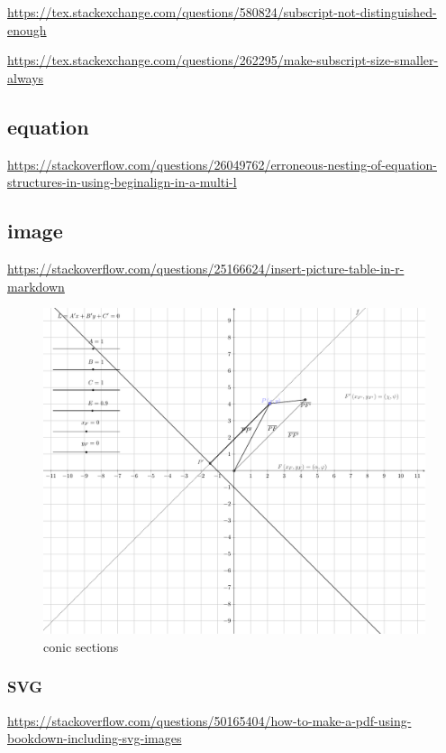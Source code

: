 \documentclass[
]{book}
\theoremstyle{definition}
\theoremstyle{definition}
\theoremstyle{definition}
\theoremstyle{definition}
\theoremstyle{remark}
\begin{document}
\url{https://tex.stackexchange.com/questions/580824/subscript-not-distinguished-enough}

\url{https://tex.stackexchange.com/questions/262295/make-subscript-size-smaller-always}

\hypertarget{equation}{%
\subsection{equation}\label{equation}}

\url{https://stackoverflow.com/questions/26049762/erroneous-nesting-of-equation-structures-in-using-beginalign-in-a-multi-l}

\hypertarget{image}{%
\subsection{image}\label{image}}

\url{https://stackoverflow.com/questions/25166624/insert-picture-table-in-r-markdown}

\begin{figure}
\includegraphics[width=0.75\linewidth]{202401280001-test_files/figure-latex/unnamed-chunk-4-1} \caption{conic sections}\label{fig:unnamed-chunk-4}
\end{figure}

\hypertarget{svg}{%
\subsubsection{SVG}\label{svg}}

\url{https://stackoverflow.com/questions/50165404/how-to-make-a-pdf-using-bookdown-including-svg-images}
\end{document}
